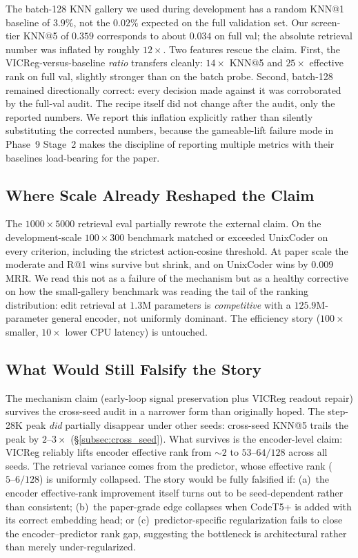 The batch-128 KNN gallery we used during development has a random KNN@1
baseline of $3.9\%$, not the $0.02\%$ expected on the full validation
set.  Our screen-tier KNN@5 of $0.359$ corresponds to about $0.034$ on
full val; the absolute retrieval number was inflated by roughly
$12\times$.  Two features rescue the claim.  First, the VICReg-versus-baseline
\emph{ratio} transfers cleanly: $14\times$ KNN@5 and $25\times$ effective
rank on full val, slightly stronger than on the batch probe.  Second,
batch-128 remained directionally correct: every decision made against it
was corroborated by the full-val audit.  The recipe itself did not change
after the audit, only the reported numbers.  We report this inflation
explicitly rather than silently substituting the corrected numbers,
because the gameable-lift failure mode in Phase~9 Stage~2 makes the
discipline of reporting multiple metrics with their baselines load-bearing
for the paper.

\subsection{Where Scale Already Reshaped the Claim}

The $1000\times5000$ retrieval eval partially rewrote the external
claim.  On the development-scale $100\times300$ benchmark \CodeWM{}
matched or exceeded UnixCoder on every criterion, including the
strictest action-cosine threshold.  At paper scale the moderate and
R@1 wins survive but shrink, and on  UnixCoder wins by
$0.009$ MRR.  We read this not as a failure of the mechanism but as a
healthy corrective on how the small-gallery benchmark was reading the
tail of the ranking distribution: edit retrieval at $1.3$M parameters
is \emph{competitive} with a $125.9$M-parameter general encoder,
not uniformly dominant.  The efficiency story ($100\times$ smaller,
$10\times$ lower CPU latency) is untouched.

\subsection{What Would Still Falsify the Story}

The mechanism claim (early-loop signal preservation plus VICReg readout
repair) survives the cross-seed audit in a narrower form than originally
hoped.  The step-28K peak \emph{did} partially disappear under other
seeds: cross-seed KNN@5 trails the peak by $2\text{--}3\times$
(\S\ref{subsec:cross_seed}).  What survives is the encoder-level claim:
VICReg reliably lifts encoder effective rank from $\sim\!2$ to
$53\text{--}64/128$ across all seeds.  The retrieval variance comes from
the predictor, whose effective rank ($5\text{--}6/128$) is uniformly
collapsed.  The story would be fully falsified if: (a)~the encoder
effective-rank improvement itself turns out to be seed-dependent rather
than consistent; (b)~the paper-grade  edge collapses
when CodeT5+ is added with its correct embedding head; or
(c)~predictor-specific regularization fails to close the
encoder--predictor rank gap, suggesting the bottleneck is architectural
rather than merely under-regularized.

